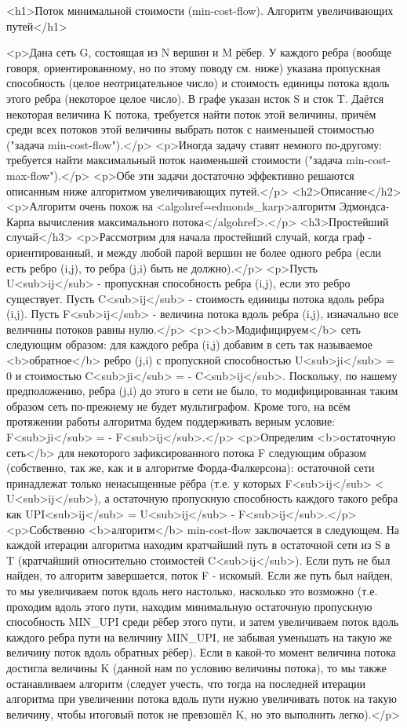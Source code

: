 <h1>Поток минимальной стоимости (min-cost-flow). Алгоритм увеличивающих путей</h1>

<p>Дана сеть G, состоящая из N вершин и M рёбер. У каждого ребра (вообще говоря, ориентированному, но по этому поводу см. ниже) указана пропускная способность (целое неотрицательное число) и стоимость единицы потока вдоль этого ребра (некоторое целое число). В графе указан исток S и сток T. Даётся некоторая величина K потока, требуется найти поток этой величины, причём среди всех потоков этой величины выбрать поток с наименьшей стоимостью ("задача min-cost-flow").</p>
<p>Иногда задачу ставят немного по-другому: требуется найти максимальный поток наименьшей стоимости ("задача min-cost-max-flow").</p>
<p>Обе эти задачи достаточно эффективно решаются описанным ниже алгоритмом увеличивающих путей.</p>
<h2>Описание</h2>
<p>Алгоритм очень похож на <algohref=edmonds_karp>алгоритм Эдмондса-Карпа вычисления максимального потока</algohref>.</p>
<h3>Простейший случай</h3>
<p>Рассмотрим для начала простейший случай, когда граф - ориентированный, и между любой парой вершин не более одного ребра (если есть ребро (i,j), то ребра (j,i) быть не должно).</p>
<p>Пусть U<sub>ij</sub> - пропускная способность ребра (i,j), если это ребро существует. Пусть C<sub>ij</sub> - стоимость единицы потока вдоль ребра (i,j). Пусть F<sub>ij</sub> - величина потока вдоль ребра (i,j), изначально все величины потоков равны нулю.</p>
<p><b>Модифицируем</b> сеть следующим образом: для каждого ребра (i,j) добавим в сеть так называемое <b>обратное</b> ребро (j,i) с пропускной способностью U<sub>ji</sub> = 0 и стоимостью C<sub>ji</sub> = - C<sub>ij</sub>. Поскольку, по нашему предположению, ребра (j,i) до этого в сети не было, то модифицированная таким образом сеть по-прежнему не будет мультиграфом. Кроме того, на всём протяжении работы алгоритма будем поддерживать верным условие: F<sub>ji</sub> = - F<sub>ij</sub>.</p>
<p>Определим <b>остаточную сеть</b> для некоторого зафиксированного потока F следующим образом (собственно, так же, как и в алгоритме Форда-Фалкерсона): остаточной сети принадлежат только ненасыщенные рёбра (т.е. у которых F<sub>ij</sub> < U<sub>ij</sub>), а остаточную пропускную способность каждого такого ребра как UPI<sub>ij</sub> = U<sub>ij</sub> - F<sub>ij</sub>.</p>
<p>Собственно <b>алгоритм</b> min-cost-flow заключается в следующем. На каждой итерации алгоритма находим кратчайший путь в остаточной сети из S в T (кратчайший относительно стоимостей C<sub>ij</sub>). Если путь не был найден, то алгоритм завершается, поток F - искомый. Если же путь был найден, то мы увеличиваем поток вдоль него настолько, насколько это возможно (т.е. проходим вдоль этого пути, находим минимальную остаточную пропускную способность MIN_UPI среди рёбер этого пути, и затем увеличиваем поток вдоль каждого ребра пути на величину MIN_UPI, не забывая уменьшать на такую же величину поток вдоль обратных рёбер). Если в какой-то момент величина потока достигла величины K (данной нам по условию величины потока), то мы также останавливаем алгоритм (следует учесть, что тогда на последней итерации алгоритма при увеличении потока вдоль пути нужно увеличивать поток на такую величину, чтобы итоговый поток не превзошёл K, но это выполнить легко).</p>

